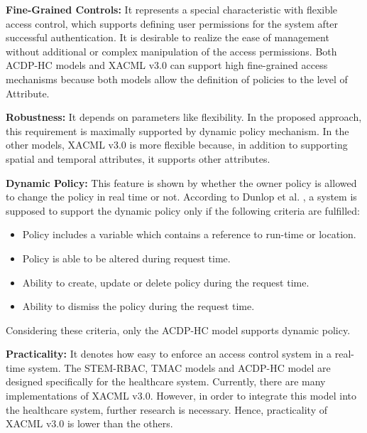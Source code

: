 \textbf{Fine-Grained Controls: }
It represents a special characteristic with flexible access control, which supports defining user permissions for the system after successful authentication.  
It is desirable to realize the ease of management without additional or complex manipulation of the access permissions. 
Both ACDP-HC models and XACML v3.0 can support high fine-grained access mechanisms because both models allow the definition of policies to the level of Attribute.

\textbf{Robustness: }
It depends on parameters like flexibility.%
In the proposed approach, this requirement is maximally supported by dynamic policy mechanism. 
In the other models, XACML v3.0 is more flexible because, in addition to supporting spatial and temporal attributes, it supports other attributes.

\textbf{Dynamic Policy: }
This feature is shown by whether the owner policy is allowed to change the policy in real time or not. 
According to Dunlop et al. \cite{dunlop2001dynamic}, a system is supposed to support the dynamic policy only if the following criteria are fulfilled:
\begin{itemize}
  \item Policy includes a variable which contains a reference to run-time or location.
  \item Policy is able to be altered during request time.
  \item Ability to create, update or delete policy during the request time.
  \item Ability to dismiss the policy during the request time.
\end{itemize}
Considering these criteria, only the ACDP-HC model supports dynamic policy.

\textbf{Practicality: }
It denotes how easy to enforce an access control system in a real-time system.  
The STEM-RBAC, TMAC models and ACDP-HC model are designed specifically for the healthcare system. 
Currently, there are many implementations of XACML v3.0. 
However, in order to integrate this model into the healthcare system, further research is necessary. 
Hence, practicality of XACML v3.0 is lower than the others.

